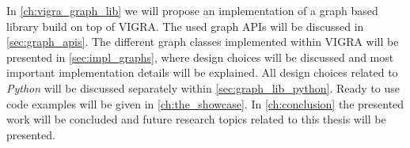 In \cref{ch:vigra_graph_lib} we will propose an implementation of
a graph based library build on top of VIGRA. 
The used graph APIs will be discussed in \cref{sec:graph_apis}.
The different graph classes implemented within VIGRA
will be presented in \cref{sec:impl_graphs}, where
design choices will be discussed and most 
important implementation details will be explained.
All design choices related to \emph{Python} will
be discussed separately within \cref{sec:graph_lib_python}.
Ready to use code examples will be given in \cref{ch:the_showcase}.
In \cref{ch:conclusion} the presented work will be concluded
and future research topics related to this thesis will be presented.




